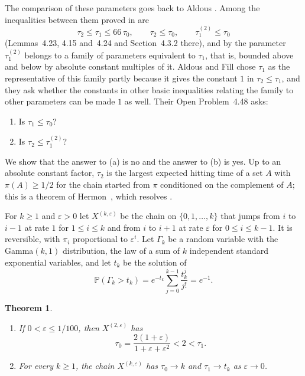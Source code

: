 \documentclass[11pt]{amsart}
\newtheorem{theorem}{Theorem}
\numberwithin{equation}{section}
\newcommand{\Pp}{\mathbb P}
\begin{document}
The comparison of these parameters goes back to Aldous \cite{Ald82}. Among the inequalities between them proved in \cite[Chapter~4]{AF} are
\[
\tau_2\le\tau_1\le66\,\tau_0,\qquad\tau_2\le\tau_0,\qquad\tau_1^{(2)}\le\tau_0
\]
(Lemmas~4.23, 4.15 and~4.24 and Section~4.3.2 there), and by \cite[Theorem~4.6]{AF} the parameter $\tau_1^{(2)}$ belongs to a family of parameters equivalent to $\tau_1$, that is, bounded above and below by absolute constant multiples of it. Aldous and Fill chose $\tau_1$ as the representative of this family partly because it gives the constant $1$ in $\tau_2\le\tau_1$, and they ask whether the constants in other basic inequalities relating the family to other parameters can be made $1$ as well. Their Open Problem~4.48 asks:
\begin{enumerate}[label=(\alph*)]
\item Is $\tau_1\le\tau_0$?
\item Is $\tau_2\le\tau_1^{(2)}$?
\end{enumerate}
We show that the answer to (a) is no and the answer to (b) is yes. Up to an absolute constant factor, $\tau_2$ is the largest expected hitting time of a set $A$ with $\pi(A)\ge1/2$ for the chain started from $\pi$ conditioned on the complement of $A$; this is a theorem of Hermon~\cite[Theorem~1.1]{Her23}, which resolves \cite[Open Problem~4.38]{AF}.

For $k\ge1$ and $\varepsilon>0$ let $X^{(k,\varepsilon)}$ be the chain on $\{0,1,\dots,k\}$ that jumps from $i$ to $i-1$ at rate $1$ for $1\le i\le k$ and from $i$ to $i+1$ at rate $\varepsilon$ for $0\le i\le k-1$. It is reversible, with $\pi_i$ proportional to $\varepsilon^i$. Let $\Gamma_k$ be a random variable with the Gamma$(k,1)$ distribution, the law of a sum of $k$ independent standard exponential variables, and let $t_k$ be the solution of
\begin{equation}\label{eq:tk}
\Pp(\Gamma_k>t_k)=e^{-t_k}\sum_{j=0}^{k-1}\frac{t_k^j}{j!}=e^{-1}.
\end{equation}

\begin{theorem}\label{thm:a}
\begin{enumerate}[label=\textup{(\roman*)}]
\item If $0<\varepsilon\le1/100$, then $X^{(2,\varepsilon)}$ has
\[
\tau_0=\frac{2(1+\varepsilon)}{1+\varepsilon+\varepsilon^2}<2<\tau_1.
\]
\item For every $k\ge1$, the chain $X^{(k,\varepsilon)}$ has $\tau_0\to k$ and $\tau_1\to t_k$ as $\varepsilon\to0$.
\end{enumerate}
\end{theorem}
\end{document}
